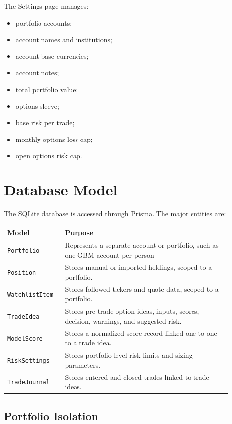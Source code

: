 \documentclass[11pt]{article}
\begin{document}
The Settings page manages:

\begin{itemize}[noitemsep]
  \item portfolio accounts;
  \item account names and institutions;
  \item account base currencies;
  \item account notes;
  \item total portfolio value;
  \item options sleeve;
  \item base risk per trade;
  \item monthly options loss cap;
  \item open options risk cap.
\end{itemize}

\section{Database Model}

The SQLite database is accessed through Prisma. The major entities are:

\begin{longtable}{p{0.22\linewidth} p{0.68\linewidth}}
\toprule
\textbf{Model} & \textbf{Purpose} \\
\midrule
\texttt{Portfolio} & Represents a separate account or portfolio, such as one GBM account per person. \\
\texttt{Position} & Stores manual or imported holdings, scoped to a portfolio. \\
\texttt{WatchlistItem} & Stores followed tickers and quote data, scoped to a portfolio. \\
\texttt{TradeIdea} & Stores pre-trade option ideas, inputs, scores, decision, warnings, and suggested risk. \\
\texttt{ModelScore} & Stores a normalized score record linked one-to-one to a trade idea. \\
\texttt{RiskSettings} & Stores portfolio-level risk limits and sizing parameters. \\
\texttt{TradeJournal} & Stores entered and closed trades linked to trade ideas. \\
\bottomrule
\end{longtable}

\subsection{Portfolio Isolation}
\end{document}
